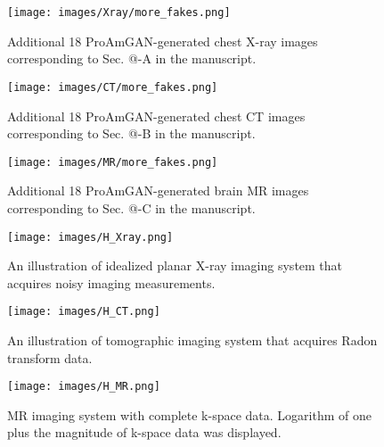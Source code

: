 \documentclass[journal, onecolumn]{IEEEtran}
\makeatletter
\newcommand*{\rom}[1]{\expandafter\@slowromancap\romannumeral #1@}
\makeatother
\begin{document}
  \vspace{-1cm}
  \begin{figure}[H]
	\centering
	\texttt{[image: images/Xray/more\_fakes.png]}
	 \vspace{-0.1cm}
	\caption{Additional 18 ProAmGAN-generated chest X-ray images corresponding to Sec. \rom{4}-A in the manuscript.}
	\label{fig:g_mri}
\end{figure}
  \vspace{-0.5cm}
  \begin{figure}[H]
	\centering
	\texttt{[image: images/CT/more\_fakes.png]}
	 \vspace{-0.1cm}
	\caption{Additional 18 ProAmGAN-generated chest CT images corresponding to Sec. \rom{4}-B in the manuscript.}
	\label{fig:g_mri}
\end{figure}
  \vspace{-0.5cm}
  \begin{figure}[H]
	\centering
	\texttt{[image: images/MR/more\_fakes.png]}
	  \vspace{-0.1cm}
	\caption{Additional 18 ProAmGAN-generated brain MR images corresponding to Sec. \rom{4}-C in the manuscript.}
	\label{fig:g_mri}
\end{figure}


\vspace{-1.2cm}
\begin{figure}[H]
     \centering
 \texttt{[image: images/H\_Xray.png]}
 \vspace{-1.6cm}
 \caption{An illustration of idealized planar X-ray imaging system that acquires noisy imaging measurements.}
 \label{fig:g_x}
  \end{figure}

\vspace{-0.6cm}
\begin{figure}[H]
     \centering
 \texttt{[image: images/H\_CT.png]}
 \vspace{-1.6cm}
 \caption{An illustration of tomographic imaging system that acquires Radon transform data.}
 \label{fig:g_ct}
  \end{figure}
  
  \vspace{-0.6cm}
  \begin{figure}[H]
	\centering
	\texttt{[image: images/H\_MR.png]}
	 \vspace{-1.6cm}
	\caption{MR imaging system with complete k-space data. Logarithm of one plus the magnitude of k-space data was displayed.}
	\label{fig:g_mri}
\end{figure}
\end{document}

